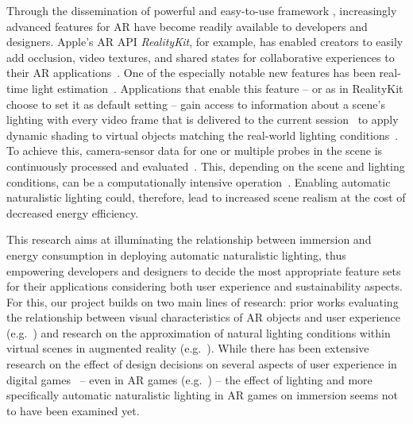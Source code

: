 \documentclass[12pt,twoside,english]{article}
\begin{document}
Through the dissemination of powerful and easy-to-use framework , increasingly advanced features for \gls{AR} have become readily available to developers and designers.
Apple's \gls{AR} \gls{API} \textit{RealityKit}, for example, has enabled creators to easily add occlusion, video textures, and shared states for collaborative experiences to their \gls{AR} applications~\cite{apple_realitykit_2020-1}.
One of the especially notable new features has been real-time light estimation~\cite{apple_arlightestimate_2020}.
Applications that enable this feature -- or as in RealityKit choose to set it as default setting -- gain access to information about a scene's lighting with every video frame that is delivered to the current session~\cite{apple_arlightestimate_2020} to apply dynamic shading to virtual objects matching the real-world lighting conditions~\cite{apple_arlightestimate_2020}.\\
To achieve this, camera-sensor data for one or multiple probes in the scene is continuously processed and evaluated~\cite{apple_arlightestimate_2020,apple_disablearenvironmentlighting_2020}.
This, depending on the scene and lighting conditions, can be a computationally intensive operation~\cite{steed_constructing_2016}.
Enabling automatic naturalistic lighting could, therefore, lead to increased scene realism at the cost of decreased energy efficiency.

This research aims at illuminating the relationship between immersion and energy consumption in deploying automatic naturalistic lighting, thus empowering developers and designers to decide the most appropriate feature sets for their applications considering both user experience and sustainability aspects.
For this, our project builds on two main lines of research: prior works evaluating the relationship between visual characteristics of \gls{AR} objects and user experience (e.g.~\cite{gabbard_effects_2006}) and research on the approximation of natural lighting conditions within virtual scenes in augmented reality (e.g.~\cite{aittala_inverse_2010}).
While there has been extensive research on the effect of design decisions on several aspects of user experience in digital games~\cite{johnson_validation_2018} -- even in \gls{AR} games (e.g.~\cite{georgiou_development_2017}) -- the effect of lighting and more specifically automatic naturalistic lighting in \gls{AR} games on immersion seems not to have been examined yet.
\end{document}
